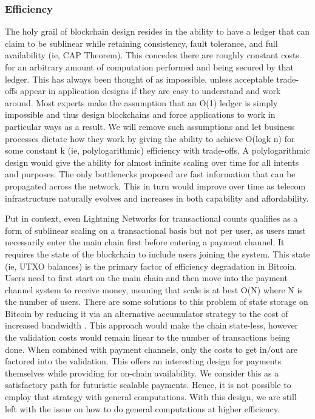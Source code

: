 \documentclass[peerreview]{ieeesyscoin}
\begin{document}
\subsubsection{Efficiency}

The holy grail of blockchain design resides in the ability to have a ledger that can claim to be sublinear while retaining consistency, fault tolerance, and full availability (ie, CAP Theorem). This concedes  there are roughly constant costs for an arbitrary amount of computation performed and being secured by that ledger. This has always been thought of as impossible, unless acceptable trade-offs appear in application designs if  they are easy to understand and work around. Most experts make the assumption that an O(1) ledger is simply impossible and thus design blockchains and force applications to work in particular ways as a result. We will remove such assumptions and let business processes dictate how they work by giving the ability to achieve O(logk n) for some constant k (ie, polylogarithmic) efficiency with trade-offs. A polylogarithmic design would give the ability for almost infinite scaling over time for all intents and purposes. The only bottlenecks proposed are fast information that can be propagated across the network. This in turn would improve over time as telecom infrastructure naturally evolves and increases in both capability and affordability.

Put in context, even Lightning Networks for transactional counts qualifies as a form of sublinear scaling on a transactional basis but not per user, as users must necessarily enter the main chain first before entering a payment channel. It requires the state of the blockchain to include users joining the system. This state (ie, UTXO balances) is the primary  factor of efficiency degradation in Bitcoin. Users need to first start on the main chain and then move into the payment channel system to receive money, meaning that scale is at best O(N) where N is the number of users. There are some solutions to this problem of state storage on Bitcoin by reducing it via an alternative accumulator strategy to the cost of increased bandwidth \cite{Dry19}. This approach would make the chain state-less,  however the validation costs would remain linear to the number of transactions being done. When combined with payment channels, only the costs to get in/out are factored into the validation. This offers an interesting design for payments themselves while providing for on-chain availability. We consider this as a satisfactory path for futuristic scalable payments. Hence, it is not possible to employ that strategy with general computations. With this design, we are still left with the issue on how to do general computations at higher efficiency.
\end{document}
